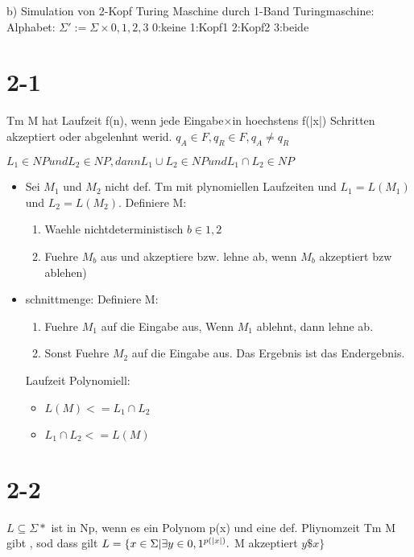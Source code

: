 \documentclass[12pt, oneside, a4paper, numbers=enddot, abstracton, parskip=full]{scrreprt}
\begin{document}
b) Simulation von 2-Kopf Turing Maschine durch 1-Band Turingmaschine:
Alphabet: $\Sigma' := \Sigma \times {0,1,2,3} $
0:keine
1:Kopf1
2:Kopf2
3:beide




\section{2-1}
Tm M hat Laufzeit f(n), wenn jede Eingabe$\times$in hoechstens f(|x|) Schritten akzeptiert oder abgelenhnt werid.
$q_A \in F, q_R \in F, q_A \neq q_R$

$L_1 \in NP und L_2 \in NP, dann L_1 \cup L_2 \in NP und L_1 \cap L_2 \in NP$

\begin{itemize}
\item Sei $M_1$ und $M_2$ nicht def. Tm mit plynomiellen Laufzeiten
  und $L_1 = L(M_1)$ und $L_2 = L(M_2)$. Definiere M: 
\begin{enumerate}
\item Waehle nichtdeterministisch $b \in {1,2}$
\item Fuehre $M_b$ aus und akzeptiere bzw. lehne ab, wenn $M_b$
  akzeptiert bzw ablehen)
\end{enumerate}
\item schnittmenge: Definiere M:
  \begin{enumerate}
  \item Fuehre $M_1$ auf die Eingabe aus, Wenn $M_1$ ablehnt, dann
    lehne ab.
  \item Sonst Fuehre $M_2$ auf die Eingabe aus. Das Ergebnis ist das Endergebnis.
  \end{enumerate}

  Laufzeit Polynomiell:
  \begin{itemize}
  \item $L(M) <= L_1\cap L_2$
  \item $L_1 \cap L_2 <= L(M)$   
  \end{itemize}

\end{itemize}

\section{2-2}
$L\subseteq \Sigma*$ ist in Np, wenn es ein Polynom p(x) und eine
def. Pliynomzeit Tm M gibt , sod dass gilt
$ L=\{x \in \Sigma\* | \exists  y \in {0,1}^{p(|x|)}.$ M akzeptiert $y \$x\}$
\end{document}
